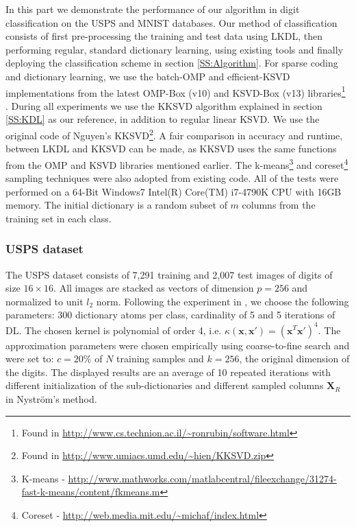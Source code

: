 \documentclass[journal]{IEEEtran}
\newcommand{\bx}{\mathbf{x}}
\newcommand{\bX}{\mathbf{X}}
\begin{document}
In this part we demonstrate the performance of our algorithm in digit classification on the USPS and MNIST databases. Our method of classification consists of first pre-processing the training and test data using LKDL, then performing regular, standard dictionary learning, using existing tools and finally deploying the classification scheme in section \ref{SS:Algorithm}. For sparse coding and dictionary learning, we use the batch-OMP and efficient-KSVD implementations from the latest OMP-Box (v10) and KSVD-Box (v13) libraries\footnote{Found in \url{http://www.cs.technion.ac.il/~ronrubin/software.html}} \cite{EfficientKSVD}.
During all experiments we use the KKSVD algorithm explained in section \ref{SS:KDL} \cite{KDL,KDL2} as our reference, in addition to regular linear KSVD. We use the original code of Nguyen's KKSVD\footnote{Found in \url{http://www.umiacs.umd.edu/~hien/KKSVD.zip}}. A fair comparison in accuracy and runtime, between LKDL and KKSVD can be made, as KKSVD uses the same functions from the OMP and KSVD libraries mentioned earlier. The k-means\footnote{K-means - \url{http://www.mathworks.com/matlabcentral/fileexchange/31274-fast-k-means/content/fkmeans.m}} and coreset\footnote{Coreset - \url{http://web.media.mit.edu/~michaf/index.html}} sampling techniques were also adopted from existing code. All of the tests were performed on a 64-Bit Windows7 Intel(R) Core(TM) i7-4790K CPU with 16GB memory.
The initial dictionary is a random subset of $m$ columns from the training set in each class.

\subsubsection{USPS dataset}\label{SSS:USPS}

The USPS dataset consists of 7,291 training and 2,007 test images of digits of size $16 \times 16$. All images are stacked as vectors of dimension $p=256$ and normalized to unit $l_2$ norm. Following the experiment in \cite{KDL2}, we choose the following parameters: 300 dictionary atoms per class, cardinality of 5 and 5 iterations of DL. The chosen kernel is polynomial of order 4, i.e. $\kappa(\bx,\bx')=(\bx^T\bx')^4$. The approximation parameters were chosen empirically using coarse-to-fine search and were set to: $c=20\%$ of $N$ training samples and $k=256$, the original dimension of the digits. The displayed results are an average of 10 repeated iterations with different initialization of the sub-dictionaries and different sampled columns $\bX_R$ in Nystr\"{o}m's method.
\end{document}
